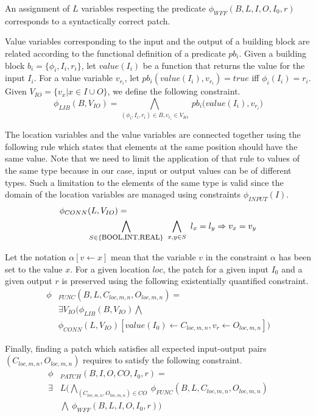 An assignment of $L$ variables respecting the predicate $\phi_{WFF}(B,L,I,O,I_0,r)$ corresponds to a syntactically correct patch. 

Value variables corresponding to the input and the output of a building block are related according to the functional definition of a predicate $pb_i$. Given a building block $b_i = \{ \phi_i, I_i, r_i\}$, let $value(I_i)$ be a function that returns the value for the input $I_i$. For a value variable $v_{r_i}$, let $pb_i(value(I_i),v_{r_i})=true$ iff $\phi_i(I_i)=r_i$. Given $V_{IO} = \{v_x | x \in I \cup O\}$, we define the following constraint.  
$$\phi_{LIB}(B,V_{IO}) = \bigwedge_{(\phi_i, I_i, r_i) \in B, v_{r_i}\in V_{IO}}\ pb_i \Big(value(I_i),v_{r_i}\Big)$$

The location variables and the value variables are connected together using the following rule which states that elements at the same position should have the same value. Note that we need to limit the application of that rule to values of the same type because in our case, input or output values can be of different types. Such a limitation to the elements of the same type is valid since the domain of the location variables are managed using constraints $ \phi_{INPUT}(I)$. 
\begin{align*}
\phi_{CONN} & (L,V_{IO}) =     \\
  & \bigwedge_{S \in \{\mbox{\footnotesize BOOL},\mbox{\footnotesize INT},\mbox{\footnotesize REAL}\}}\ \bigwedge_{x,y \in S}\ l_x = l_y \Rightarrow v_x = v_y
\end{align*}

Let the notation $\alpha[v \leftarrow x]$ mean that the variable $v$ in the constraint $\alpha$ has been set to the value $x$. For a given location $loc$, the patch for a given input $I_0$ and a given output $r$ is preserved using the following existentially quantified constraint.
\begin{align*}
\phi&_{FUNC} (B,L,C_{loc,m,n},O_{loc,m,n}) = \\
  & \exists V_{IO} \Big( \phi_{LIB}(B,V_{IO}) \bigwedge  \\
  & \phi_{CONN}(L,V_{IO}) [value(I_0) \leftarrow  C_{loc,m,n}, v_r \leftarrow O_{loc,m,n}] \Big)
\end{align*}

Finally, finding a patch which satisfies all expected input-output pairs $(C_{loc,m,n},O_{loc,m,n})$ requires to satisfy the following constraint.
\begin{align*}
\phi&_{PATCH}(B,I,O,CO,I_0,r) =  \\
  \exists & L \Big( \bigwedge_{(C_{loc,m,n},O_{loc,m,n}) \in CO} \  \phi_{FUNC}(B,L,C_{loc,m,n},O_{loc,m,n}) \\
  & \bigwedge \ \phi_{WFF}(B,L,I,O,I_0,r)   \Big)
\end{align*}

